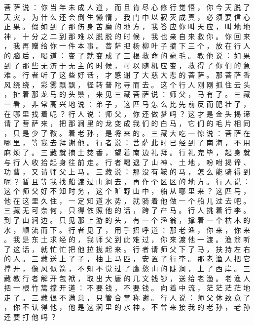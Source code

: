 {菩 萨 说 ： 你 当 年 未 成 人 道 ， 而 且 肯 尽 心 修 行 觉 悟 ， 你 今 天 脱 了 天 灾 ， 为 什 么 还 会 倒 生 懒 惰 ， 我 门 中 以 寂 灭 成 真 ， 必 须 要 信 心 正 果 。
假 如 到 了 那 伤 身 苦 磨 的 地 方 ， 我 答 应 你 叫 天 应 ， 叫 地 地 神 ， 十 分 之 二 到 那 难 以 脱 脱 的 时 候 ， 我 也 亲 自 来 救 你 。
你 回 来 ， 我 再 赠 给 你 一 件 本 事 。
菩 萨 把 杨 柳 叶 子 摘 下 三 个 ， 放 在 行 人 的 脑 后 ， 喝 道 ： 变 了 就 变 成 了 三 根 救 命 的 毫 毛 。
教 他 说 ： 如 果 到 了 那 些 无 济 于 无 主 的 时 候 ， 可 以 随 机 应 变 ， 救 得 了 你 们 的 急 难 。
行 者 听 了 这 些 好 话 ， 才 感 谢 了 大 慈 大 悲 的 菩 萨 。
那 菩 萨 香 风 绕 绕 ， 彩 雾 飘 飘 ， 径 转 普 陀 寺 而 去 。
这 个 行 人 刚 刚 抓 住 云 头 ， 扯 着 那 龙 马 的 头 鬃 ， 来 见 三 藏 菩 萨 说 ： 师 父 ， 马 有 了 。
三 藏 一 看 ， 非 常 高 兴 地 说 ： 弟 子 ， 这 匹 马 怎 么 比 先 前 反 而 肥 壮 了 ， 在 哪 里 找 着 呢 ？ 行 人 说 ： 师 父 ， 你 还 做 梦 吗 ？
这 才 是 金 头 揭 谛 请 了 菩 萨 来 ， 把 那 涧 里 的 龙 变 成 我 们 的 白 马 ， 它 们 的 毛 片 相 同 ， 只 是 少 了 鞍 。
着 老 孙 ， 是 将 来 的 。
三 藏 大 吃 一 惊 说 ： 菩 萨 在 哪 里 ， 等 我 去 拜 谢 他 。
行 者 说 ： 菩 萨 此 时 已 经 到 了 南 海 ， 不 用 麻 烦 了 。
三 藏 就 摘 土 焚 香 ， 望 着 南 边 礼 拜 。
行 礼 完 毕 ， 起 身 就 与 行 人 收 拾 起 身 往 前 走 。
行 者 喝 退 了 山 神 、 土 地 ， 吩 咐 揭 谛 、 功 曹 ， 又 请 师 父 上 马 。
三 藏 说 ： 那 没 有 鞍 的 马 ， 怎 么 能 骑 得 到 呢 ？ 暂 且 等 我 找 船 渡 过 山 涧 去 ， 再 作 个 区 区 的 地 方 。
行 人 说 ： 这 个 师 父 好 不 知 时 务 ， 这 个 旷 野 山 中 ， 船 从 哪 里 来 ？ 这 匹 马 ， 他 在 这 里 久 住 ， 一 定 知 道 水 势 ， 就 骑 着 他 做 一 个 船 儿 过 去 吧 。
三 藏 无 可 奈 何 ， 只 得 依 照 他 的 话 ， 跨 了 产 马 。
行 人 挑 着 行 李 。
到 了 山 涧 边 。
只 见 那 上 游 的 头 ， 有 一 个 渔 翁 ， 撑 着 一 个 枯 木 的 水 ， 顺 流 而 下 。
行 者 见 了 ， 用 手 招 呼 道 ： 那 老 渔 ， 你 来 ， 你 来 。
我 是 东 土 求 经 的 ， 我 师 父 到 此 难 过 ， 你 来 渡 他 一 渡 。
渔 翁 听 了 这 话 ， 就 忙 忙 把 他 拉 拢 起 来 。
行 者 请 师 父 下 了 马 ， 扶 持 左 右 的 人 。
三 藏 送 上 了 子 ， 抽 上 马 匹 ， 安 置 了 行 李 。
那 老 渔 人 把 它 撑 开 ， 像 风 似 箭 ， 不 知 不 觉 过 了 鹰 愁 山 的 陡 涧 ， 上 了 西 岸 。
三 藏 教 行 者 解 开 包 袱 ， 取 出 大 唐 的 几 文 钱 钞 ， 送 给 老 渔 。
老 渔 人 把 一 根 竹 篙 撑 开 道 ： 不 要 钱 ， 不 要 钱 。
向 着 中 流 ， 茫 茫 茫 茫 地 走 了 。
三 藏 很 不 满 意 ， 只 管 合 掌 称 谢 。
行 人 说 ： 师 父 休 致 意 了 ， 你 不 认 得 他 ， 他 是 这 涧 里 的 水 神 。
不 曾 来 接 我 的 老 孙 ， 老 孙 还 要 打 他 吗 ？
}
